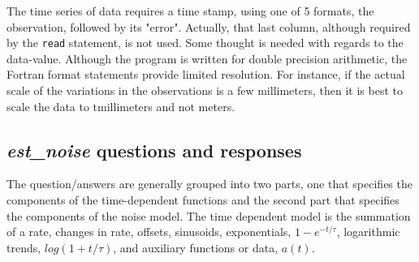 \documentclass[12pt]{amsart}
\begin{document}
The time series of data requires a time stamp, using one of 5 formats, the observation, followed by its "error". Actually,
that last column, although required by the \texttt{read} statement, is not used. Some thought is needed with
regards to the data-value.  Although the program is written for double precision arithmetic, the Fortran format statements
provide limited resolution. For instance, if the actual scale of the variations in the observations is a few
millimeters, then it is best to scale the data to tmillimeters and not meters. 


\subsection{\textit{est\_noise} questions and responses}

The question/answers are generally grouped into two parts, one that specifies the components of the time-dependent functions and the second part that specifies the components of the noise model.  The time dependent model is the summation of a rate, changes in rate, offsets, sinusoids, exponentials, $1 - e^{-t/{\tau}}$, logarithmic trends,
$log(1 + {t/{\tau}})$, and auxiliary functions or data, $a(t)$.
\end{document}
